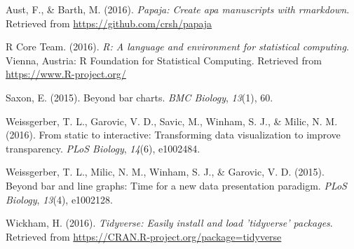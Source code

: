 \documentclass[english,floatsintext,man]{apa6}
\begin{document}
\hypertarget{ref-R-papaja}{}
Aust, F., \& Barth, M. (2016). \emph{Papaja: Create apa manuscripts with
rmarkdown}. Retrieved from \url{https://github.com/crsh/papaja}

\hypertarget{ref-R-base}{}
R Core Team. (2016). \emph{R: A language and environment for statistical
computing}. Vienna, Austria: R Foundation for Statistical Computing.
Retrieved from \url{https://www.R-project.org/}

\hypertarget{ref-Saxon}{}
Saxon, E. (2015). Beyond bar charts. \emph{BMC Biology}, \emph{13}(1),
60.

\hypertarget{ref-Weissgerber2016}{}
Weissgerber, T. L., Garovic, V. D., Savic, M., Winham, S. J., \& Milic,
N. M. (2016). From static to interactive: Transforming data
visualization to improve transparency. \emph{PLoS Biology},
\emph{14}(6), e1002484.

\hypertarget{ref-Weissgerber2015}{}
Weissgerber, T. L., Milic, N. M., Winham, S. J., \& Garovic, V. D.
(2015). Beyond bar and line graphs: Time for a new data presentation
paradigm. \emph{PLoS Biology}, \emph{13}(4), e1002128.

\hypertarget{ref-R-tidyverse}{}
Wickham, H. (2016). \emph{Tidyverse: Easily install and load 'tidyverse'
packages}. Retrieved from
\url{https://CRAN.R-project.org/package=tidyverse}
\end{document}
